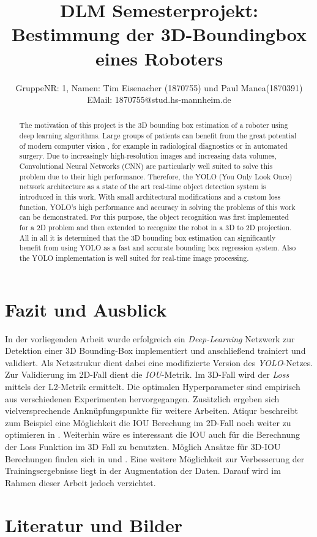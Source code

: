 \documentclass{article}
\title{DLM Semesterprojekt: Bestimmung der 3D-Boundingbox eines Roboters}
\author{%
  GruppeNR: 1, Namen: Tim Eisenacher (1870755) und Paul Manea(1870391) \\
  EMail: 1870755@stud.hs-mannheim.de
}
\begin{document}

\maketitle


\begin{abstract}
The motivation of this project is the 3D bounding box estimation of a roboter using deep learning algorithms. Large groups of patients can benefit from the great potential of modern computer vision , for example in radiological diagnostics or in  automated surgery. Due to increasingly high-resolution images and increasing data volumes, Convolutional Neural Networks (CNN) are particularly well suited to solve this problem due to their high performance. Therefore, the YOLO (You Only Look Once) network architecture as a state of the art real-time object detection system is introduced in this work. With small architectural modifications and a custom loss function, YOLO's high performance and accuracy in solving the problems of this work can be demonstrated. For this purpose, the object recognition was first implemented for a 2D problem and then extended to recognize the robot in a 3D to 2D projection. All in all it is determined that the 3D bounding box estimation can signiﬁcantly beneﬁt from
using YOLO as a fast and accurate bounding box regression system. Also the YOLO implementation is well suited for real-time image processing.	
\end{abstract}

\newpage
 



 


\newpage
\section{Fazit und Ausblick}

In der vorliegenden Arbeit wurde erfolgreich ein \textit{Deep-Learning} Netzwerk zur Detektion einer 3D Bounding-Box implementiert und anschließend trainiert und validiert. Als Netzstrukur dient dabei eine modifizierte Version des \textit{YOLO}-Netzes. Zur Validierung im 2D-Fall dient die \textit{IOU}-Metrik. Im 3D-Fall wird der \textit{Loss} mittels der L2-Metrik ermittelt. Die optimalen Hyperparameter sind empirisch aus verschiedenen Experimenten hervorgegangen.
Zusätzlich ergeben sich vielversprechende Anknüpfungspunkte für weitere Arbeiten. Atiqur beschreibt zum Beispiel eine Möglichkeit die IOU Berechung im 2D-Fall noch weiter zu optimieren in \cite{Atiqur}. Weiterhin wäre es interessant die IOU auch für die Berechnung der Loss Funktion im 3D Fall zu benutzten. Möglich Ansätze für 3D-IOU Berechungen finden sich in \cite{Xu2019} und \cite{Mousavian1612}. Eine weitere Möglichkeit zur Verbesserung der Trainingsergebnisse liegt in der Augmentation der Daten. Darauf wird im Rahmen dieser Arbeit jedoch verzichtet.

\newpage
\section{Literatur und Bilder}



\listoffigures
\end{document}
